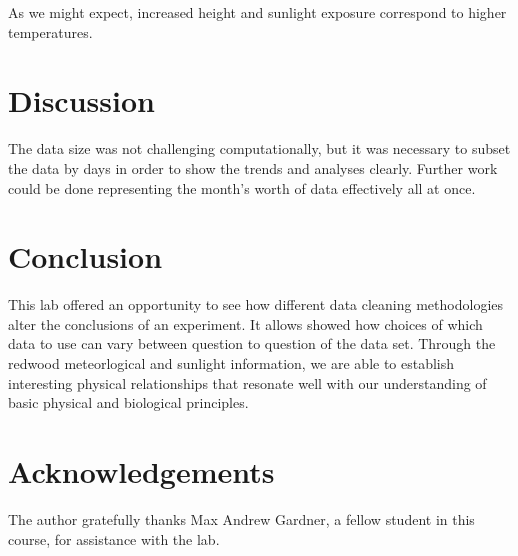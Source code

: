 \documentclass[english]{article}\usepackage[]{graphicx}\usepackage[]{color}
\begin{document}
As we might expect, increased height and sunlight exposure correspond to higher temperatures.

\section{Discussion}

The data size was not challenging computationally, but it was necessary to subset the data by
days in order to show the trends and analyses clearly.  Further work could be done representing the 
month's worth of data effectively all at once.

\section{Conclusion}

This lab offered an opportunity to see how different data cleaning 
methodologies alter the conclusions of an experiment.  It allows showed how 
choices of which data to use can vary between question to question of the 
data set.  Through the redwood meteorlogical and sunlight information, we 
are able to establish interesting physical relationships that resonate well
with our understanding of basic physical and biological principles.

\section{Acknowledgements}

The author gratefully thanks Max Andrew Gardner, a fellow student in this course, for assistance with the lab.
\end{document}

